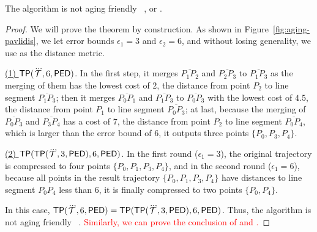 \begin{theorem}
\label{theo-aging-tp}
The \tpa algorithm is not aging friendly \wrt~\ped, \sed or \dad.
\end{theorem}

\begin{proof}
We will prove the theorem by construction.
As shown in Figure~\ref{fig:aging-pavlidis}, we let error bounds $\epsilon_1 =3$ and $\epsilon_2=6$, and without losing generality, we use \ped as the distance metric.

\underline{(1) ${{\mathsf{TP}}}(\dddot{\mathcal{T}}, 6, {\mathsf{PED}})$}. In the first step, it merges $\overline{P_1P_2}$ and $\overline{P_2P_3}$ to $\overline{P_1P_3}$ as the merging of them has the lowest cost of $2$, the distance from point $P_2$ to line segment $\overline{P_1P_3}$; then it merges $\overline{P_0P_1}$ and $\overline{P_1P_3}$ to $\overline{P_0P_3}$ with the lowest cost of $4.5$, the distance from point $P_1$ to line segment $\overline{P_0P_3}$; at last, because the merging of $\overline{P_0P_3}$ and $\overline{P_3P_4}$ has a cost of $7$, the distance from point $P_2$ to line segment $\overline{P_0P_4}$, which is larger than the error bound of $6$, it outputs three points $\{P_0, P_3, P_4\}$.

\underline{(2) ${{\mathsf{TP}}}({\mathsf{TP}}(\dddot{\mathcal{T}}, 3, {\mathsf{PED}}), 6, {\mathsf{PED}})$}. In the first round ($\epsilon_1=3$), the original trajectory is compressed to four points $\{P_0, P_1, P_3, P_4\}$, and in the second round ($\epsilon_1=6$), because all points in the result trajectory $\{P_0, P_1, P_3, P_4\}$ have distances to line segment $P_0P_4$ less than $6$, it is finally compressed to two points $\{P_0, P_4\}$.

In this case, ${{\mathsf{TP}}}(\dddot{\mathcal{T}}, 6, {\mathsf{PED}}) = {{\mathsf{TP}}}({\mathsf{TP}}(\dddot{\mathcal{T}}, 3, {\mathsf{PED}}), 6, {\mathsf{PED}})$. Thus, the \tpa algorithm is not aging friendly \wrt~\ped.
\textcolor{red}{Similarly, we can prove the conclusion of \sed and \dad.}
\end{proof}


